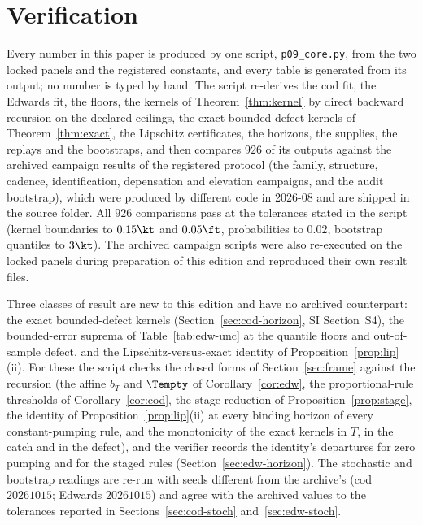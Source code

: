\section{Verification}\label{sec:verification}

Every number in this paper is produced by one script, \texttt{p09\_core.py}, from the two locked panels and the registered constants, and every table is generated from its output; no number is typed by hand. The script re-derives the cod fit, the Edwards fit, the floors, the kernels of Theorem~\ref{thm:kernel} by direct backward recursion on the declared ceilings, the exact bounded-defect kernels of Theorem~\ref{thm:exact}, the Lipschitz certificates, the horizons, the supplies, the replays and the bootstraps, and then compares $926$ of its outputs against the archived campaign results of the registered protocol (the family, structure, cadence, identification, depensation and elevation campaigns, and the audit bootstrap), which were produced by different code in 2026-08 and are shipped in the source folder. All $926$ comparisons pass at the tolerances stated in the script (kernel boundaries to $0.15\kt$ and $0.05\ft$, probabilities to $0.02$, bootstrap quantiles to $3\kt$). The archived campaign scripts were also re-executed on the locked panels during preparation of this edition and reproduced their own result files.

Three classes of result are new to this edition and have no archived counterpart: the exact bounded-defect kernels (Section~\ref{sec:cod-horizon}, SI Section~S4), the bounded-error suprema of Table~\ref{tab:edw-unc} at the quantile floors and out-of-sample defect, and the Lipschitz-versus-exact identity of Proposition~\ref{prop:lip}(ii). For these the script checks the closed forms of Section~\ref{sec:frame} against the recursion (the affine $b_T$ and $\Tempty$ of Corollary~\ref{cor:edw}, the proportional-rule thresholds of Corollary~\ref{cor:cod}, the stage reduction of Proposition~\ref{prop:stage}, the identity of Proposition~\ref{prop:lip}(ii) at every binding horizon of every constant-pumping rule, and the monotonicity of the exact kernels in $T$, in the catch and in the defect), and the verifier records the identity's departures for zero pumping and for the staged rules (Section~\ref{sec:edw-horizon}). The stochastic and bootstrap readings are re-run with seeds different from the archive's (cod $20261015$; Edwards $20261015$) and agree with the archived values to the tolerances reported in Sections~\ref{sec:cod-stoch} and~\ref{sec:edw-stoch}.

